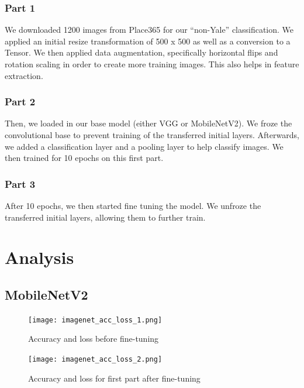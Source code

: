 \documentclass[letterpaper]{article} %
\begin{document}
\subsubsection{Part 1}
We downloaded 1200 images from Place365 for our “non-Yale” classification. We applied an initial resize transformation of 500 x 500 as well as a conversion to a Tensor. We then applied data augmentation, specifically horizontal flips and rotation scaling in order to create more training images. This also helps in feature extraction. 

\subsubsection{Part 2}
Then, we loaded in our base model (either VGG or MobileNetV2). We froze the convolutional base to prevent training of the transferred initial layers. Afterwards, we added a classification layer and a pooling layer to help classify images. We then trained for 10 epochs on this first part. 

\subsubsection{Part 3}
After 10 epochs, we then started fine tuning the model. We unfroze the transferred initial layers, allowing them to further train.

\section{Analysis}

\subsection{MobileNetV2}

\begin{figure}[h!]
    \centering
    \begin{minipage}{0.2\textwidth}
        \centering
        \texttt{[image: imagenet\_acc\_loss\_1.png]}
        \caption{Accuracy and loss before fine-tuning}
        \label{fig:fig1}
    \end{minipage}
    \hfill
    \begin{minipage}{0.2\textwidth}
        \centering
        \texttt{[image: imagenet\_acc\_loss\_2.png]}
        \caption{Accuracy and loss for first part after fine-tuning}
        \label{fig:fig2}
    \end{minipage}
\end{figure}
\end{document}
